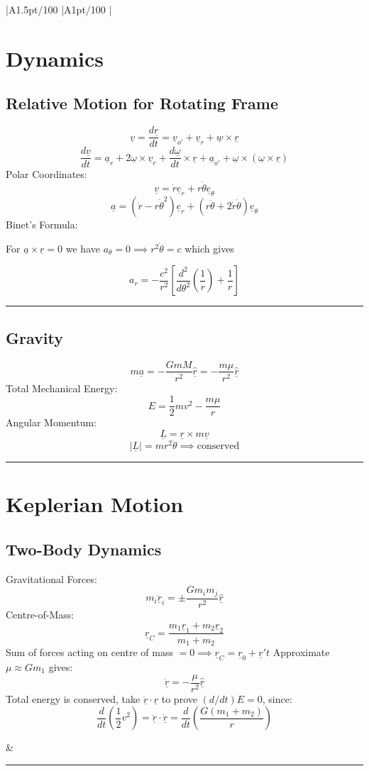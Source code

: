 \documentclass[table,cmyk]{article}
\makeatletter
\newcommand\ratio[2]{\strip@pt\dimexpr#1pt/#2\relax}
\makeatother
\begin{document}
\begin{longtable}
{
    |A{1.5}{\ratio{50}{100}}%
    |A{1}{\ratio{50}{100}}%
    |%
}\hline
\section*{Dynamics}
\subsection*{Relative Motion for Rotating Frame}
\[\underline{v} = \frac{d \underline{r}}{d t} = \underline{v}_{o'} + \underline{v}_r + \underline{w} \times \underline{r}\]
\[ \frac{d\underline{v}}{dt} = \underline{a}_r + 2\underline{\omega}\times\underline{v}_r + \frac{d\underline{\omega}}{dt}\times\underline{r}+\underline{a}_{o'}+\underline{\omega}\times(\underline{\omega}\times\underline{r})\]
Polar Coordinates:
\[\underline{v} = \dot{r}\underline{e}_r + r\dot{\theta}\underline{e}_{\theta}\]
\[\underline{a} = (\ddot{r}-r\dot{\theta}^2)\underline{e}_r + (r\ddot{\theta} + 2\dot{r}\dot{\theta})\underline{e}_{\theta}\]
Binet's Formula:

For $\underline{a} \times \underline{r} = 0$ we have $a_{\theta} = 0 \implies r^2 \dot{\theta} = c$ which gives

\[a_r = -\frac{c^2}{r^2}\left[\frac{d^2}{d\theta^2}\left(\frac{1}{r}\right)+\frac{1}{r}\right]\]

\vspace{0.5cm}
\noindent\rule{9cm}{0.4pt}
\subsection*{Gravity}
\[m\underline{a} = -\frac{GmM}{r^2}\underline{\hat{r}} = -\frac{m\mu}{r^2}\underline{\hat{r}}\]
Total Mechanical Energy:
\[E = \frac{1}{2}mv^2 - \frac{m\mu}{r}\]
Angular Momentum:
\[\underline{L} = \underline{r}\times m \underline{v} \]
\[|\underline{L}| = mr^2\dot{\theta} \implies \text{conserved}\]

\vspace{0.5cm}
\noindent\rule{9cm}{0.4pt}
\section*{Keplerian Motion}
\subsection*{Two-Body Dynamics}
Gravitational Forces:
\[m_i\ddot{\underline{r}}_i=\pm \frac{Gm_im_j}{r^2}\underline{\hat{r}}\]
Centre-of-Mass:
\[\underline{r}_C = \frac{m_1\underline{r}_1 + m_2\underline{r}_2}{m_1+m_2}\]
Sum of forces acting on centre of mass $= 0 \implies \underline{r}_C = \underline{r}_0 + \underline{r}'t$
Approximate $\mu \approx Gm_1$ gives:
\[\ddot{\underline{r}} = -\frac{\mu}{r^2}\underline{\hat{r}}\]
Total energy is conserved, take $\ddot{\underline{r}}\cdot\underline{r}$ to prove $(d/dt) E = 0$, since:
\[\frac{d}{dt}\left(\frac{1}{2}v^2\right) = \underline{\ddot{r}}\cdot\underline{\dot{r}} =  \frac{d}{dt}\left(\frac{G(m_1+m_2)}{r}\right)\]

&
\vspace{2cm}

\noindent\rule{9cm}{0.4pt}
\tabularnewline\hline

\end{longtable}
\end{document}
